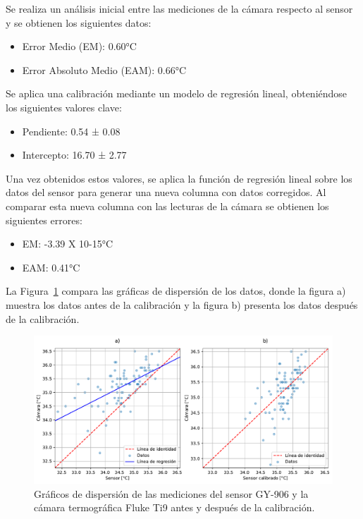 \documentclass[
  12pt,
  letterpaper,
  DIV=11,
  numbers=noendperiod]{scrreport}
\providecommand{\tightlist}{%
  \setlength{\itemsep}{0pt}\setlength{\parskip}{0pt}}\usepackage{longtable,booktabs,array}
\begin{document}
Se realiza un análisis inicial entre las mediciones de la cámara
respecto al sensor y se obtienen los siguientes datos:

\begin{itemize}
\tightlist
\item
  Error Medio (EM): 0.60°C
\item
  Error Absoluto Medio (EAM): 0.66°C
\end{itemize}

Se aplica una calibración mediante un modelo de regresión lineal,
obteniéndose los siguientes valores clave:

\begin{itemize}
\tightlist
\item
  Pendiente: 0.54 ± 0.08
\item
  Intercepto: 16.70 ± 2.77
\end{itemize}

Una vez obtenidos estos valores, se aplica la función de regresión
lineal sobre los datos del sensor para generar una nueva columna con
datos corregidos. Al comparar esta nueva columna con las lecturas de la
cámara se obtienen los siguientes errores:

\begin{itemize}
\tightlist
\item
  EM: -3.39 X 10-15°C
\item
  EAM: 0.41°C
\end{itemize}

La Figura~\ref{fig-dispersion} compara las gráficas de dispersión de los
datos, donde la figura a) muestra los datos antes de la calibración y la
figura b) presenta los datos después de la calibración.

\begin{figure}

{\centering \includegraphics{Capitulos/desarrollo_files/figure-pdf/fig-dispersion-output-1.pdf}

}

\caption{\label{fig-dispersion}Gráficos de dispersión de las mediciones
del sensor GY-906 y la cámara termográfica Fluke Ti9 antes y después de
la calibración.}

\end{figure}
\end{document}
